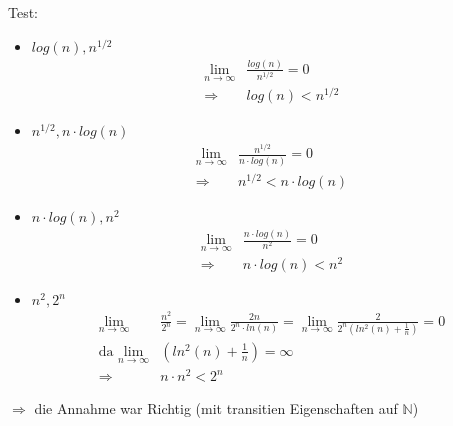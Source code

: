 \documentclass[12pt, a4paper, reqno]{amsart}
\begin{document}
    Test:
    \begin{itemize}
        \item $log(n), n^{1/2}$
        \begin{align}
            \lim_{n\to \infty}&\frac{log(n)}{n^{1/2}} = 0\\
            \Rightarrow &log(n) < n^{1/2} 
        \end{align}
        
        \item $n^{1/2}, n\cdot log(n)$
        \begin{align}
        \lim_{n\to \infty}&\frac{n^{1/2}}{n\cdot log(n)} = 0\\
        \Rightarrow &n^{1/2}<n\cdot log(n) 
        \end{align}
        
        \item $n\cdot log(n), n^2$
        \begin{align}
        \lim_{n\to \infty}&\frac{n\cdot log(n)}{n^{2}} = 0\\
        \Rightarrow &n\cdot log(n) < n^2 
        \end{align}
        
        \item $n^2, 2^n$
        \begin{align}
        \lim_{n\to \infty}&\frac{n^{2}}{2^n} = \lim_{n\to \infty}\frac{2n}{2^n\cdot ln(n)} = \lim_{n\to \infty}\frac{2}{2^n(ln^2(n)+\frac 1 n)}= 0\\
        \text{da } \lim_{n\to \infty} &\left( ln^2(n)+\frac 1 n \right)=\infty\\
        \Rightarrow &n\cdot n^2 < 2^n 
        \end{align}
    \end{itemize}
    $\Rightarrow$ die Annahme war Richtig (mit transitien Eigenschaften auf $\mathbb N$)
\end{document}
